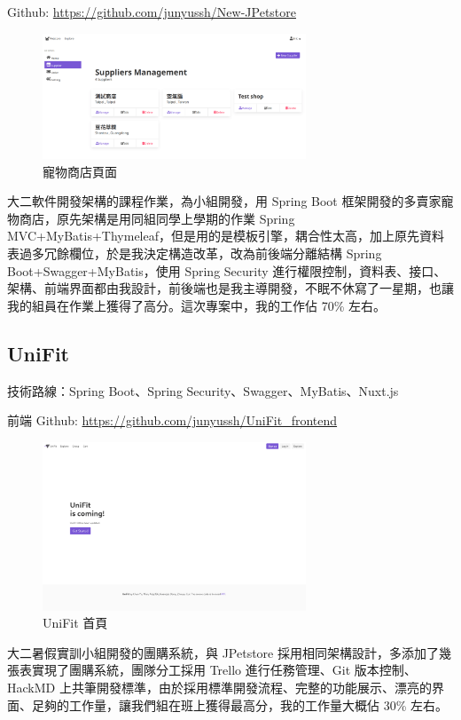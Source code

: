 \documentclass[classical]{einfart}
\begin{document}
Github: \url{https://github.com/junyussh/New-JPetstore}

\begin{figure}[H]
    \centering
    \includegraphics[width=0.7\textwidth]{images/petstore.png}
    \caption{寵物商店頁面}
\end{figure}

大二軟件開發架構的課程作業，為小組開發，用 Spring Boot
框架開發的多賣家寵物商店，原先架構是用同組同學上學期的作業 Spring
MVC+MyBatis+Thymeleaf，但是用的是模板引擎，耦合性太高，加上原先資料表過多冗餘欄位，於是我決定構造改革，改為前後端分離結構
Spring Boot+Swagger+MyBatis，使用 Spring Security
進行權限控制，資料表、接口、架構、前端界面都由我設計，前後端也是我主導開發，不眠不休寫了一星期，也讓我的組員在作業上獲得了高分。這次專案中，我的工作佔
70\% 左右。

\subsection{UniFit}

技術路線：Spring Boot、Spring Security、Swagger、MyBatis、Nuxt.js

前端 Github: \url{https://github.com/junyussh/UniFit_frontend}


\begin{figure}[H]
    \centering
    \includegraphics[width=0.7\textwidth]{images/unifit.png}
    \caption{UniFit 首頁}
\end{figure}

大二暑假實訓小組開發的團購系統，與 JPetstore
採用相同架構設計，多添加了幾張表實現了團購系統，團隊分工採用 Trello
進行任務管理、Git 版本控制、HackMD
上共筆開發標準，由於採用標準開發流程、完整的功能展示、漂亮的界面、足夠的工作量，讓我們組在班上獲得最高分，我的工作量大概佔
30\% 左右。
\end{document}
